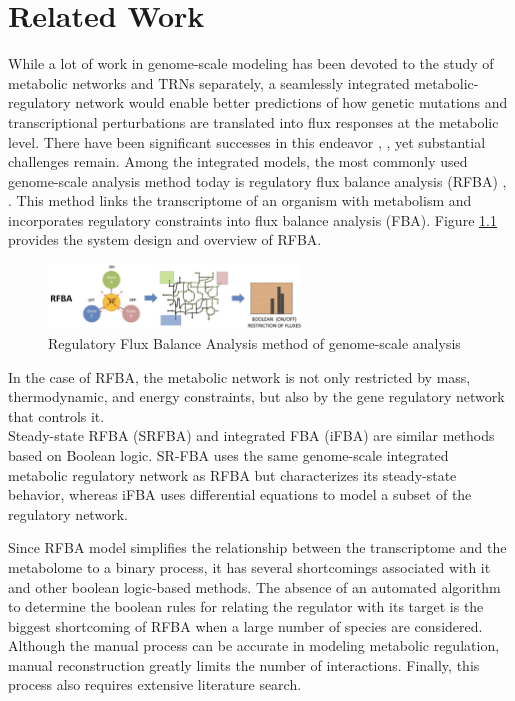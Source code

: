 \documentclass[12pt,chapterheads]{ucsd}
\begin{document}

\chapter{Related Work} \label{chap:related_work}

While a lot of work in genome-scale modeling has been devoted to the study of metabolic networks and TRNs separately, a seamlessly integrated metabolic-regulatory network would enable better predictions of how genetic mutations and transcriptional perturbations are translated into flux responses at the metabolic level. There have been significant successes in this endeavor \cite{Covert2004}, \cite{Herrgård2006}, yet substantial challenges remain. Among the integrated models, the most commonly used genome-scale analysis method today is regulatory flux balance analysis (RFBA) \cite{Covert2004}, \cite{COVERT200173}. This method links the transcriptome of an organism with metabolism and 
incorporates regulatory constraints into flux balance analysis (FBA).
Figure \ref{fig:rfba} provides the system design and overview of RFBA.
\begin{figure}[h] 
\centering
\includegraphics[width=0.6\textwidth]{Figures/rfba}
\caption[Regulatory Flux Balance Analysis method of genome-scale analysis]
{Regulatory Flux Balance Analysis method of genome-scale analysis \cite{Chandrasekaran17845}}
\label{fig:rfba}
\end{figure}

In the case of RFBA, the metabolic network is not only restricted by mass, thermodynamic, and energy constraints, but also by the gene regulatory network that controls it.\\
Steady-state RFBA (SRFBA) \cite{Shlomi2007} and integrated FBA (iFBA) \cite{doi:10.1093/bioinformatics/btn352} are similar methods based on Boolean logic. SR-FBA uses the same genome-scale integrated metabolic regulatory network as RFBA but characterizes its steady-state behavior, whereas iFBA uses differential equations to model a subset of the regulatory network.

Since RFBA model simplifies the relationship between the transcriptome and the metabolome to a binary process, it has several shortcomings associated with it and other boolean logic-based methods. The absence of an automated algorithm to determine the boolean rules for relating the regulator with its target is the biggest shortcoming of RFBA when a large number of species are considered. Although the manual process can be accurate in modeling metabolic regulation, manual reconstruction greatly limits the number of interactions. Finally, this process also requires extensive literature search. 
\end{document}
